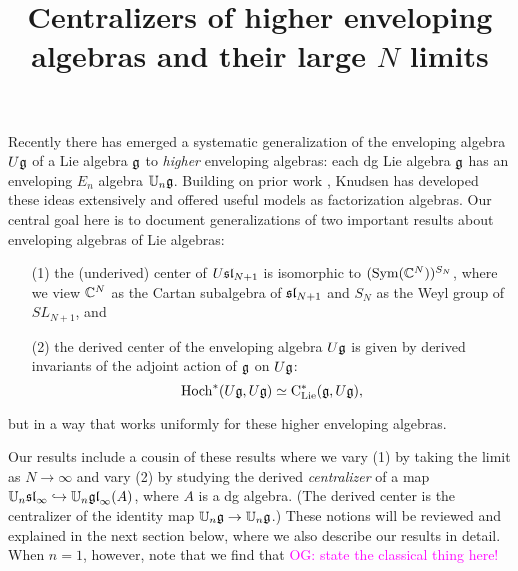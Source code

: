 \documentclass[11pt]{amsart}
\numberwithin{equation}{section}
\def\owen{\textcolor{magenta}{OG: }\textcolor{magenta}}
\begin{document}
\title{Centralizers of higher enveloping algebras and their large $N$ limits}

%


\maketitle
\thispagestyle{empty}

\tableofcontents
 
Recently there has emerged a systematic generalization of the enveloping algebra $U\fg$ of a Lie algebra $\fg$ to {\em higher} enveloping algebras:
each dg Lie algebra $\fg$ has an enveloping $E_n$ algebra $\UU_n\fg$.
Building on prior work \cite{BD, AF}, Knudsen \cite{Knudsen} has developed these ideas extensively and offered useful models as factorization algebras.
Our central goal here is to document generalizations of two important results about enveloping algebras of Lie algebras: 
\begin{enumerate}
\item[(1)] the (underived) center of $U\sl_{N+1}$ is isomorphic to $(\Sym(\CC^{N}))^{S_N}$, where we view $\CC^{N}$ as the Cartan subalgebra of $\sl_{N+1}$ and $S_N$ as the Weyl group of $SL_{N+1}$, and
\item[(2)] the derived center of the enveloping algebra $U\fg$ is given by derived invariants of the adjoint action of $\fg$ on $U\fg$:
\[
\Hoch^*(U\fg,U\fg) \simeq \clies(\fg, U\fg),
\]
\end{enumerate}
but in a way that works uniformly for these higher enveloping algebras.

Our results include a cousin of these results where we vary (1) by taking the limit as $N \to \infty$ and vary (2) by studying the derived {\em centralizer} of a map $\UU_n\sl_\infty \hookrightarrow \UU_n\gl_\infty(A)$, where $A$ is a dg algebra.
(The derived center is the centralizer of the identity map $\UU_n\fg \to \UU_n\fg$.)
These notions will be reviewed and explained in the next section below,
where we also describe our results in detail.
When $n=1$, however, note that we find that \owen{state the classical thing here!}
\end{document}
